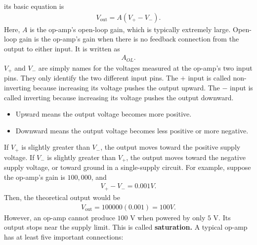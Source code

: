 \documentclass{report}
\begin{document}
\begin{itemize}
\begin{itemize}
            \end{itemize}
            its basic equation is 
            \begin{align*}
                V_{\text{out}} = A(V_{+} - V_{-})
            .\end{align*}
            Here, \(A\) is the op-amp’s open-loop gain, which is typically extremely large.
            \bigbreak \noindent 
            Open-loop gain is the op-amp’s gain when there is no feedback connection from the output to either input. It is written as
            \begin{align*}
                A_{OL}
            .\end{align*}
            $V_{+}$ and \(V_-\) are simply names for the voltages measured at the op-amp’s two input pins. They only identify the two different input pins.
            \bigbreak \noindent 
            The \(+\) input is called non-inverting because increasing its voltage pushes the output upward. The \(-\) input is called inverting because increasing its voltage pushes the output downward.
            \begin{itemize}
                \item Upward means the output voltage becomes more positive.
                \item Downward means the output voltage becomes less positive or more negative.
            \end{itemize}
            If \(V_+\) is slightly greater than \(V_-\), the output moves toward the positive supply voltage.
            \bigbreak \noindent 
            If \(V_-\) is slightly greater than \(V_+\), the output moves toward the negative supply voltage, or toward ground in a single-supply circuit.
            \bigbreak \noindent 
            For example, suppose the op-amp’s gain is \(100{,}000\), and 
            \begin{align*}
                V_{+} - V_{-} = 0.001 V
            .\end{align*}
            Then, the theoretical output would be 
            \begin{align*}
                V_{\text{out}} = 100000(0.001) = 100V
            .\end{align*}
            However, an op-amp cannot produce \(100\text{ V}\) when powered by only \(5\text{ V}\). Its output stops near the supply limit. This is called \textbf{saturation.}
            \bigbreak \noindent 
            A typical op-amp has at least five important connections:
            \begin{itemize}

\end{itemize}
\end{itemize}
\end{document}
